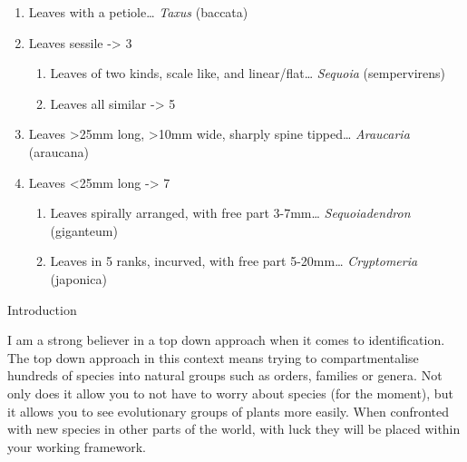 \documentclass[openany]{book}
\providecommand{\tightlist}{%
  \setlength{\itemsep}{0pt}\setlength{\parskip}{0pt}}
\begin{document}
\begin{enumerate}
\def\labelenumi{\arabic{enumi}.}
\tightlist
\item
  Leaves with a petiole\ldots{} \emph{Taxus} (baccata)
\item
  Leaves sessile -\textgreater{} 3

  \begin{enumerate}
  \def\labelenumii{\arabic{enumii}.}
  \setcounter{enumii}{2}
  \tightlist
  \item
    Leaves of two kinds, scale like, and linear/flat\ldots{}
    \emph{Sequoia} (sempervirens)
  \item
    Leaves all similar -\textgreater{} 5
  \end{enumerate}
\item
  Leaves \textgreater{}25mm long, \textgreater{}10mm wide, sharply spine
  tipped\ldots{} \emph{Araucaria} (araucana)
\item
  Leaves \textless{}25mm long -\textgreater{} 7

  \begin{enumerate}
  \def\labelenumii{\arabic{enumii}.}
  \setcounter{enumii}{6}
  \tightlist
  \item
    Leaves spirally arranged, with free part 3-7mm\ldots{}
    \emph{Sequoiadendron} (giganteum)
  \item
    Leaves in 5 ranks, incurved, with free part 5-20mm\ldots{}
    \emph{Cryptomeria} (japonica)
  \end{enumerate}
\end{enumerate}

Introduction

I am a strong believer in a top down approach when it comes to
identification. The top down approach in this context means trying to
compartmentalise hundreds of species into natural groups such as orders,
families or genera. Not only does it allow you to not have to worry
about species (for the moment), but it allows you to see evolutionary
groups of plants more easily. When confronted with new species in other
parts of the world, with luck they will be placed within your working
framework.
\end{document}
